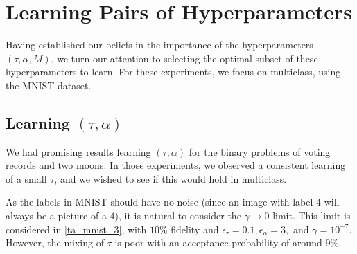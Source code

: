 \documentclass{siamart1116}
\begin{document}
\section{Learning Pairs of Hyperparameters}
    Having established our beliefs in the importance of the hyperparameters $(\tau, \alpha, M)$, we turn our attention to selecting the optimal subset of these hyperparameters to learn. For these experiments, we focus on multiclass, using the MNIST dataset.
    \subsection{Learning $(\tau, \alpha)$}
        We had promising results learning $(\tau, \alpha)$ for the binary problems of voting records and two moons. In those experiments, we observed a consistent learning of a small $\tau$, and we wished to see if this would hold in multiclass.

        As the labels in MNIST should have no noise (since an image with label $4$ will always be a picture of a $4$), it is natural to consider the $\gamma \to 0$ limit. This limit is considered in \cref{ta_mnist_3}, with $10\%$ fidelity and $\epsilon_\tau = 0.1, \epsilon_\alpha = 3,$ and $\gamma = 10^{-7}$. However, the mixing of $\tau$ is poor with an acceptance probability of around $9\%$.

\end{document}
